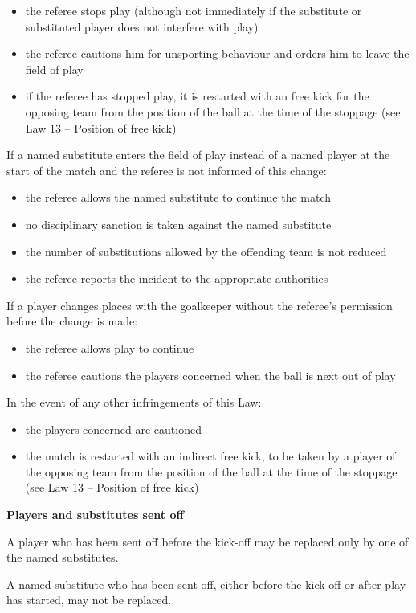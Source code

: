 \begin{itemize}
\item the referee stops play (although not immediately if the substitute or substituted player does not interfere with play)
\item the referee cautions him for unsporting behaviour and orders him to leave the field of play 
\item if the referee has stopped play, it is restarted with an   free kick for the opposing team from the position of the ball at the time of the stoppage (see Law 13 -- Position of free kick)
\end{itemize}

\bigskip

If a named substitute enters the field of play instead of a named player at the start of the match and the referee is not informed of this change:

\begin{itemize}
\item the referee allows the named substitute to continue the match 
\item no disciplinary sanction is taken against the named substitute 
\item the number of substitutions allowed by the offending team is not reduced 
\item the referee reports the incident to the appropriate authorities
\end{itemize}

\bigskip

If a player changes places with the goalkeeper without the
referee's permission before the change is made: 

\begin{itemize}
\item the referee allows play to continue
\item the referee cautions the players concerned when the ball is next out of play
\end{itemize}

\bigskip

In the event of any other infringements of this Law:

\begin{itemize}
\item the players concerned are cautioned
\item the match is restarted with an indirect free kick, to be taken by a player of the opposing team from the position of the ball at the time of the stoppage (see Law 13 -- Position of free kick)
\end{itemize}

\bigskip

{\bfseries Players and substitutes sent off}

\headlinebox

A player who has been sent off before the kick-off may be replaced only by one of the named substitutes.

\bigskip

A named substitute who has been sent off, either before the kick-off or after play has started, may not be replaced.
